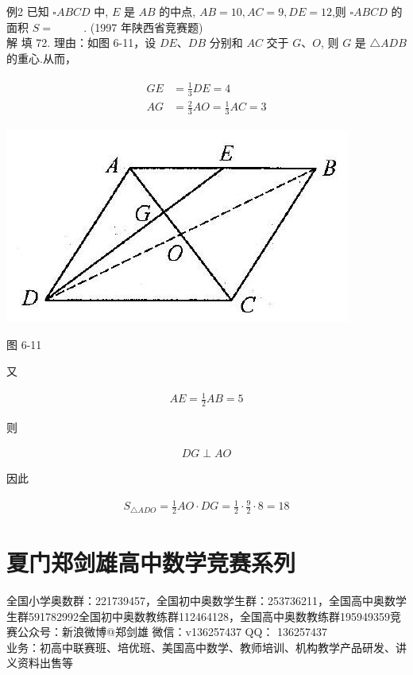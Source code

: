 \documentclass[10pt]{article}
\begin{document}
例2 已知 $\square A B C D$ 中, $E$ 是 $A B$ 的中点, $A B=10, A C=9, D E=12$,则 $\square A B C D$ 的面积 $S=$ $\qquad$ . (1997 年陕西省竞赛题)\\
解 填 72. 理由：如图 6-11，设 $D E 、 D B$ 分别和 $A C$ 交于 $G 、 O$, 则 $G$ 是 $\triangle A D B$ 的重心.从而，

\begin{align*}
\begin{aligned}
G E & =\frac{1}{3} D E=4 \\
A G & =\frac{2}{3} A O=\frac{1}{3} A C=3
\end{aligned}
\end{align*}

\begin{center}
\includegraphics[max width=\textwidth]{2024_10_30_2c8f45efd4a519b08e1ag-065(1)}
\end{center}

图 6-11

又

\begin{align*}
A E=\frac{1}{2} A B=5
\end{align*}

则

\begin{align*}
D G \perp A O
\end{align*}

因此

\begin{align*}
S_{\triangle A D O}=\frac{1}{2} A O \cdot D G=\frac{1}{2} \cdot \frac{9}{2} \cdot 8=18
\end{align*}

\section*{夏门郑剑雄高中数学竞赛系列}
全国小学奥数群：221739457，全国初中奥数学生群：253736211，全国高中奥数学生群591782992全国初中奥数教练群112464128，全国高中奥数教练群195949359竞赛公众号：新浪微博@郑剑雄 微信：v136257437 QQ： 136257437\\
业务：初高中联赛班、培优班、美国高中数学、教师培训、机构教学产品研发、讲义资料出售等
\end{document}
